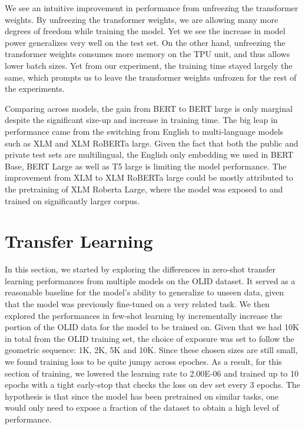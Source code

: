 \documentclass[11pt,a4paper]{article}
\begin{document}
We see an intuitive improvement in performance from unfreezing the transformer weights. By unfreezing the transformer weights, we are allowing many more degrees of freedom while training the model. Yet we see the increase in model power generalizes very well on the test set. On the other hand, unfreezing the transformer weights consumes more memory on the TPU unit, and thus allows lower batch sizes. Yet from our experiment, the training time stayed largely the same, which prompts us to leave the transformer weights unfrozen for the rest of the experiments. 

Comparing across models, the gain from BERT to BERT large is only marginal despite the significant size-up and increase in training time. The big leap in performance came from the switching from English to multi-language models such as XLM and XLM RoBERTa large. Given the fact that both the public and private test sets are multilingual, the English only embedding we used in BERT Base, BERT Large as well as T5 large is limiting the model performance. The improvement from XLM to XLM RoBERTa large could be mostly attributed to the pretraining of XLM Roberta Large, where the model was exposed to and trained on significantly larger corpus. 

\section{Transfer Learning}

In this section, we started by exploring the differences in zero-shot transfer learning performances from multiple models on the OLID dataset. It served as a reasonable baseline for the model’s ability to generalize to unseen data, given that the model was previously fine-tuned on a very related task. We then explored the performances in few-shot learning by incrementally increase the portion of the OLID data for the model to be trained on. Given that we had 10K in total from the OLID training set, the choice of exposure was set to follow the geometric sequence: 1K, 2K, 5K and 10K. Since these chosen sizes are still small, we found training loss to be quite jumpy across epoches. As a result, for this section of training, we lowered the learning rate to 2.00E-06 and trained up to 10 epochs with a tight early-stop that checks the loss on dev set every 3 epochs. The hypothesis is that since the model has been pretrained on similar tasks, one would only need to expose a fraction of the dataset to obtain a high level of performance.
\end{document}
